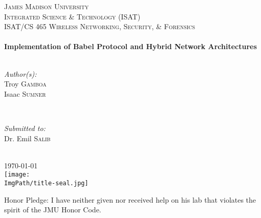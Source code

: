 \documentclass[main.tex]{subfiles}
\begin{document}
\begin{titlepage}

\center

\textsc{\LARGE{James Madison University}}
\\[0.5cm] 
\textsc{\Large{Integrated Science \& Technology (ISAT)}}
\\[0.4cm]
\textsc{\large ISAT/CS 465 Wireless Networking, Security, \& Forensics}
\\[0.4cm]

\HRule
\\[0.35cm]
\Large {\bfseries Implementation of Babel Protocol and Hybrid Network Architectures}
\\[0.35cm] 
\HRule 
\\[0.5cm]

\begin{minipage}{0.4\textwidth}
\begin{flushleft} \large
\emph{Author(s):}\\

Troy \textsc{Gamboa}\\ 
Isaac \textsc{Sumner}\\
\end{flushleft}
\end{minipage}
~
\begin{minipage}{0.4\textwidth}
\begin{flushright} \large
\emph{Submitted to:} \\

Dr. Emil \textsc{Salib} 
\end{flushright}
\end{minipage}
\\[0.5cm]

{\large \today}
\\[0.5cm] 

\texttt{[image: \\ImgPath/title-seal.jpg]}
\\[0.4cm] 

\begin{flushleft} Honor Pledge: I have neither given nor received help on his lab that violates the spirit of the JMU Honor Code.
\\[0.5cm]
\end{flushleft}


\begin{adjustbox}{width=1.2\textwidth,center=\textwidth}


\end{adjustbox}

\end{titlepage}
\end{document}
